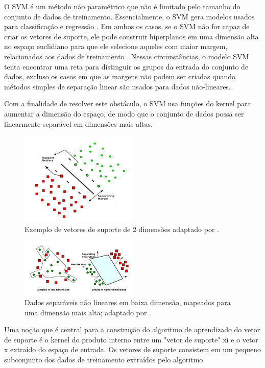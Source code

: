 O SVM é um método não paramétrico que não é limitado pelo tamanho do conjunto de dados de treinamento. Essencialmente, o SVM gera modelos usados para classificação e regressão \cite{svm-1}. Em ambos os casos, se o SVM não for capaz de criar os vetores de suporte, ele pode construir hiperplanos em uma dimensão alta no espaço euclidiano para que ele selecione aqueles com maior margem, relacionados aos dados de treinamento \cite{svm-content}.  Nessas circunstâncias, o modelo SVM tenta encontrar uma reta para distinguir os grupos da entrada do conjunto de dados, excluso os casos em que as margens não podem ser criadas quando métodos simples de separação linear são usados para dados não-lineares. 

Com a finalidade de resolver este obstáculo, o SVM usa funções do kernel para aumentar a dimensão do espaço, de modo que o conjunto de dados possa ser linearmente separável em dimensões mais altas.

\begin{figure}[h]
    \centering
    \includegraphics[width=0.5\textwidth]{images/svm_1.png}
    \caption{Exemplo de vetores de suporte de 2 dimensões adaptado por \cite{svm-content}.}
    \label{fig:svm_1}
\end{figure}

\begin{figure}[h]
    \centering
    \includegraphics[width=0.5\textwidth]{images/svm_2.png}
    \caption{Dados separáveis não lineares em baixa dimensão, mapeados para uma dimensão mais alta; adaptado por \cite{svm-content}.}
    \label{fig:svm_2}
\end{figure}

Uma noção que é central para a construção do algoritmo de aprendizado do vetor de suporte é o kernel do produto interno entre um "vetor de suporte" xi e o vetor x extraído do espaço de entrada. Os vetores de suporte consistem em um pequeno subconjunto dos dados de treinamento extraídos pelo algoritmo

